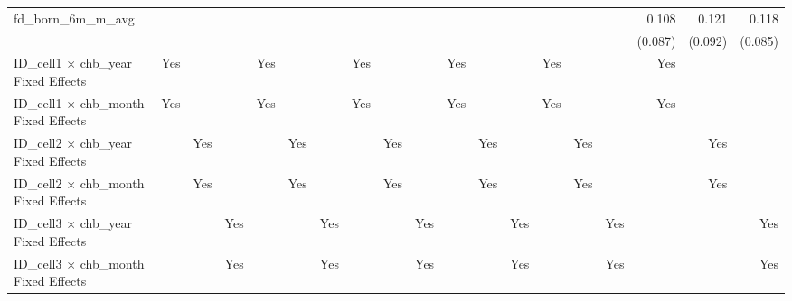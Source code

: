 \begin{tabular}{lrrrrrrrrrrrrrrrrrr}
fd\_born\_6m\_m\_avg                        &             &             &             &             &             &             &             &             &             &             &             &             &             &             &             &       0.108 &       0.121 &       0.118 \\ 
                                            &             &             &             &             &             &             &             &             &             &             &             &             &             &             &             &     (0.087) &     (0.092) &     (0.085) \\ 
\midrule
ID\_cell1 $\times$ chb\_year Fixed Effects  &         Yes &             &             &         Yes &             &             &         Yes &             &             &         Yes &             &             &         Yes &             &             &         Yes &             &             \\ 
ID\_cell1 $\times$ chb\_month Fixed Effects &         Yes &             &             &         Yes &             &             &         Yes &             &             &         Yes &             &             &         Yes &             &             &         Yes &             &             \\ 
ID\_cell2 $\times$ chb\_year Fixed Effects  &             &         Yes &             &             &         Yes &             &             &         Yes &             &             &         Yes &             &             &         Yes &             &             &         Yes &             \\ 
ID\_cell2 $\times$ chb\_month Fixed Effects &             &         Yes &             &             &         Yes &             &             &         Yes &             &             &         Yes &             &             &         Yes &             &             &         Yes &             \\ 
ID\_cell3 $\times$ chb\_year Fixed Effects  &             &             &         Yes &             &             &         Yes &             &             &         Yes &             &             &         Yes &             &             &         Yes &             &             &         Yes \\ 
ID\_cell3 $\times$ chb\_month Fixed Effects &             &             &         Yes &             &             &         Yes &             &             &         Yes &             &             &         Yes &             &             &         Yes &             &             &         Yes \\ 

\end{tabular}
